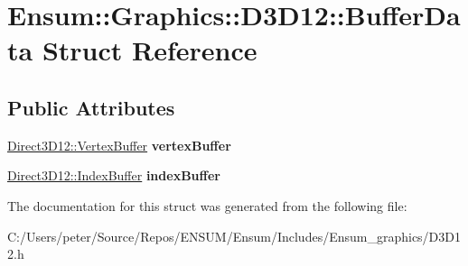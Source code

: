 \hypertarget{struct_ensum_1_1_graphics_1_1_d3_d12_1_1_buffer_data}{}\section{Ensum\+:\+:Graphics\+:\+:D3\+D12\+:\+:Buffer\+Data Struct Reference}
\label{struct_ensum_1_1_graphics_1_1_d3_d12_1_1_buffer_data}
\subsection*{Public Attributes}
\begin{DoxyCompactItemize}
\item 
\hyperlink{struct_ensum_1_1_graphics_1_1_direct3_d12_1_1_vertex_buffer}{Direct3\+D12\+::\+Vertex\+Buffer} {\bfseries vertex\+Buffer}\hypertarget{struct_ensum_1_1_graphics_1_1_d3_d12_1_1_buffer_data_a9787a0e725740ef75ca11ab061d9f220}{}\label{struct_ensum_1_1_graphics_1_1_d3_d12_1_1_buffer_data_a9787a0e725740ef75ca11ab061d9f220}

\item 
\hyperlink{struct_ensum_1_1_graphics_1_1_direct3_d12_1_1_index_buffer}{Direct3\+D12\+::\+Index\+Buffer} {\bfseries index\+Buffer}\hypertarget{struct_ensum_1_1_graphics_1_1_d3_d12_1_1_buffer_data_acd5aa18485b646c9ef4f23239512fa80}{}\label{struct_ensum_1_1_graphics_1_1_d3_d12_1_1_buffer_data_acd5aa18485b646c9ef4f23239512fa80}

\end{DoxyCompactItemize}


The documentation for this struct was generated from the following file\+:\begin{DoxyCompactItemize}
\item 
C\+:/\+Users/peter/\+Source/\+Repos/\+E\+N\+S\+U\+M/\+Ensum/\+Includes/\+Ensum\+\_\+graphics/D3\+D12.\+h\end{DoxyCompactItemize}
